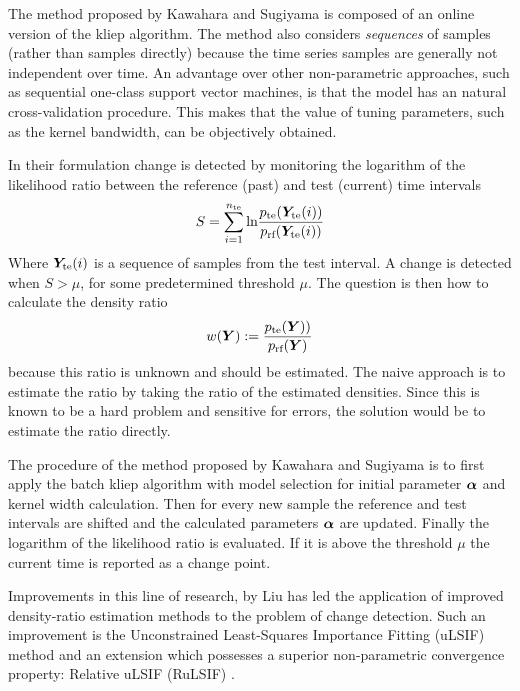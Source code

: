 The method proposed by Kawahara and Sugiyama \cite{kawahara2009change} is composed of an online version of the \gls{kliep} algorithm.
The method also considers \emph{sequences} of samples (rather than samples directly) because the time series samples are generally not independent over time.
An advantage over other non-parametric approaches, such as sequential one-class support vector machines, is that the model has an natural cross-validation procedure.
This makes that the value of tuning parameters, such as the kernel bandwidth, can be objectively obtained.

In their formulation change is detected by monitoring the logarithm of the likelihood ratio between the reference (past) and test (current) time intervals
\begin{equation}
  S = \sum_{i=1}^{n_\text{te}} \text{ln} \frac{p_{\text{te}}(\matrixsym{Y}_\text{te}(i))}{p_\text{rf}(\matrixsym{Y}_\text{te}(i))}
\end{equation}
Where $\matrixsym{Y}_\text{te}(i)$ is a sequence of samples from the test interval.
A change is detected when $S > \mu$, for some predetermined threshold $\mu$.
The question is then how to calculate the density ratio
\begin{equation}
  w(\matrixsym{Y}) := \frac{p_\text{te}(\matrixsym{Y)})}{p_\text{rf}(\matrixsym{Y})}
\end{equation}
because this ratio is unknown and should be estimated.
The naive approach is to estimate the ratio by taking the ratio of the estimated densities.
Since this is known to be a hard problem and sensitive for errors, the solution would be to estimate the ratio directly.

The procedure of the method proposed by Kawahara and Sugiyama \cite{kawahara2009change} is to first apply the batch \gls{kliep} algorithm with model selection for initial parameter $\vectorsym{\alpha}$ and kernel width calculation.
Then for every new sample the reference and test intervals are shifted and the calculated parameters $\vectorsym{\alpha}$ are updated.
Finally the logarithm of the likelihood ratio is evaluated.
If it is above the threshold $\mu$ the current time is reported as a change point.

Improvements in this line of research, by Liu \etal \cite{liu2013change} has led the application of improved density-ratio estimation methods to the problem of change detection.
Such an improvement is the Unconstrained Least-Squares Importance Fitting (uLSIF) method \cite{kanamori2009least} and an extension which possesses a superior non-parametric convergence property: Relative uLSIF (RuLSIF) \cite{yamada2013relative}.